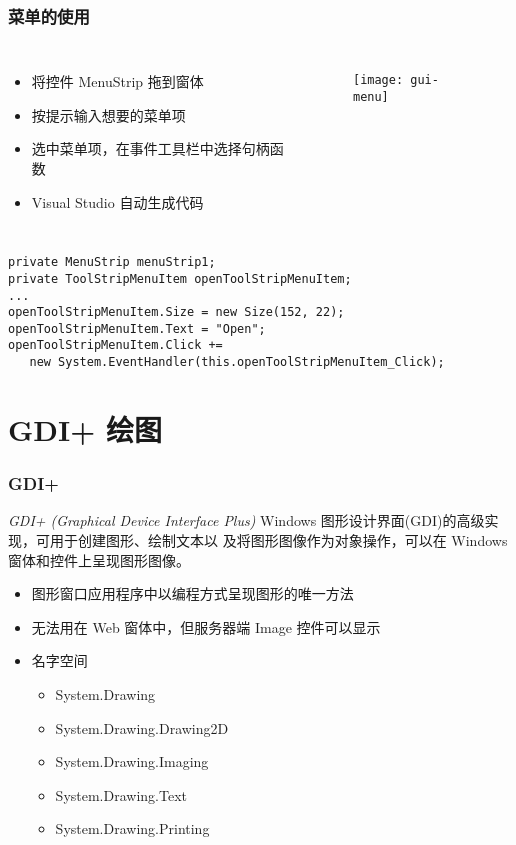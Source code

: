 \begin{frame}[fragile]
\frametitle{菜单的使用}
\begin{columns}
  \begin{itemize}
  \item 将控件 MenuStrip 拖到窗体
  \item 按提示输入想要的菜单项
  \item 选中菜单项，在事件工具栏中选择句柄函数
  \item Visual Studio 自动生成代码
  \end{itemize}
  \begin{figure}[htbp]
    \centering
    \texttt{[image: gui-menu]}
  \end{figure}
\end{columns}
\begin{lstlisting}
private MenuStrip menuStrip1;
private ToolStripMenuItem openToolStripMenuItem;
...
openToolStripMenuItem.Size = new Size(152, 22);
openToolStripMenuItem.Text = "Open";
openToolStripMenuItem.Click += 
   new System.EventHandler(this.openToolStripMenuItem_Click);
\end{lstlisting}
\end{frame}


\section{GDI+ 绘图}

\begin{frame}
\frametitle{GDI+}
\begin{block}{\textit{GDI+ (Graphical Device Interface Plus)}}
  \CJKindent Windows 图形设计界面(GDI)的高级实现，可用于创建图形、绘制文本以
  及将图形图像作为对象操作，可以在 Windows 窗体和控件上呈现图形图像。
\end{block}

\begin{itemize}
\item 图形窗口应用程序中以编程方式呈现图形的唯一方法
\item 无法用在 Web 窗体中，但服务器端 Image 控件可以显示
\item 名字空间

\begin{itemize}
\item System.Drawing 
\item System.Drawing.Drawing2D
\item System.Drawing.Imaging
\item System.Drawing.Text
\item System.Drawing.Printing
\end{itemize}
\end{itemize}
\end{frame}

